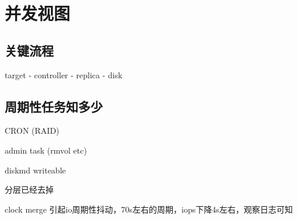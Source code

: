 \chapter{并发视图}

\section{关键流程}

target - controller - replica - disk

\section{周期性任务知多少}

\begin{enumbox}
\item CRON (RAID)
\item admin task (rmvol etc)
\item diskmd writeable
\item 分层已经去掉
\item clock merge 引起io周期性抖动，70s左右的周期，iops下降4s左右，观察日志可知
\end{enumbox}
